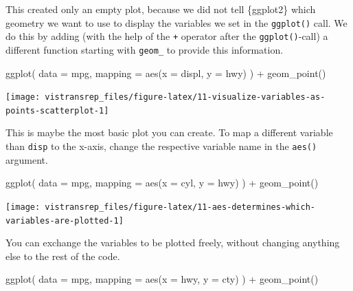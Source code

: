 \documentclass[]{book}
\newenvironment{Shaded}{}{}
\newcommand{\DataTypeTok}[1]{#1}
\newcommand{\KeywordTok}[1]{\textcolor[rgb]{0.00,0.00,1.00}{#1}}
\newcommand{\NormalTok}[1]{#1}
\newcommand{\OperatorTok}[1]{#1}
\newcommand{\StringTok}[1]{\textcolor[rgb]{0.00,0.50,0.50}{#1}}
\begin{document}
This created only an empty plot, because we did not tell \{ggplot2\} which geometry we want to use to display the variables we set in the \texttt{ggplot()} call.
We do this by adding (with the help of the \texttt{+} operator after the \texttt{ggplot()}-call) a different function starting with \texttt{geom\_} to provide this information.

\begin{Shaded}
\begin{Highlighting}[]
\KeywordTok{ggplot}\NormalTok{(}
  \DataTypeTok{data =}\NormalTok{ mpg,}
  \DataTypeTok{mapping =} \KeywordTok{aes}\NormalTok{(}\DataTypeTok{x =}\NormalTok{ displ, }\DataTypeTok{y =}\NormalTok{ hwy)}
\NormalTok{) }\OperatorTok{+}
\StringTok{  }\KeywordTok{geom_point}\NormalTok{()}
\end{Highlighting}
\end{Shaded}

\begin{flushright}\texttt{[image: vistransrep\_files/figure-latex/11-visualize-variables-as-points-scatterplot-1]} \end{flushright}

This is maybe the most basic plot you can create.
To map a different variable than \texttt{disp} to the x-axis, change the respective variable name in the \texttt{aes()} argument.

\begin{Shaded}
\begin{Highlighting}[]
\KeywordTok{ggplot}\NormalTok{(}
  \DataTypeTok{data =}\NormalTok{ mpg,}
  \DataTypeTok{mapping =} \KeywordTok{aes}\NormalTok{(}\DataTypeTok{x =}\NormalTok{ cyl, }\DataTypeTok{y =}\NormalTok{ hwy)}
\NormalTok{) }\OperatorTok{+}
\StringTok{  }\KeywordTok{geom_point}\NormalTok{()}
\end{Highlighting}
\end{Shaded}

\begin{flushright}\texttt{[image: vistransrep\_files/figure-latex/11-aes-determines-which-variables-are-plotted-1]} \end{flushright}

You can exchange the variables to be plotted freely, without changing anything else to the rest of the code.

\begin{Shaded}
\begin{Highlighting}[]
\KeywordTok{ggplot}\NormalTok{(}
  \DataTypeTok{data =}\NormalTok{ mpg,}
  \DataTypeTok{mapping =} \KeywordTok{aes}\NormalTok{(}\DataTypeTok{x =}\NormalTok{ hwy, }\DataTypeTok{y =}\NormalTok{ cty)}
\NormalTok{) }\OperatorTok{+}
\StringTok{  }\KeywordTok{geom_point}\NormalTok{()}
\end{Highlighting}
\end{Shaded}
\end{document}
